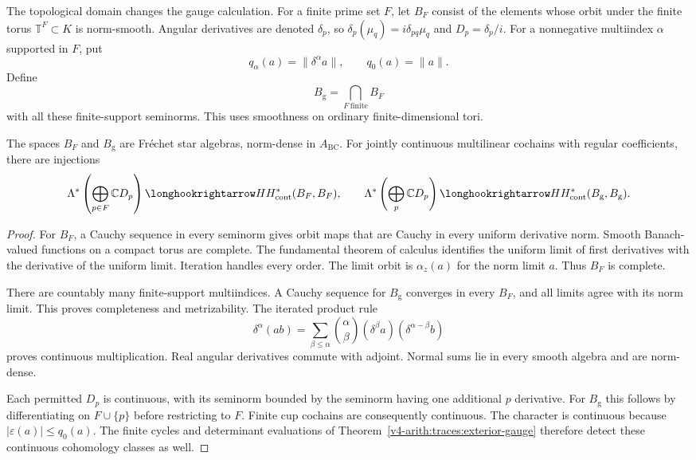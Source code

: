 The topological domain changes the gauge calculation. For a finite prime set
$F$, let $B_F$ consist of the elements whose orbit under the finite torus
$\mathbb T^F\subset K$ is norm-smooth. Angular derivatives are denoted
$\delta_p$, so $\delta_p(\mu_q)=i\delta_{pq}\mu_q$ and $D_p=\delta_p/i$. For
a nonnegative multiindex $\alpha$ supported in $F$, put
\[
 q_\alpha(a)=\|\delta^\alpha a\|,\qquad
 q_0(a)=\|a\|.
\]
Define
\[
 B_{\mathrm g}=\bigcap_{F\ \mathrm{finite}}B_F
\]
with all these finite-support seminorms. This uses smoothness on ordinary
finite-dimensional tori.

\begin{proposition}
\label{v4-arith:traces:gauge-smooth}
The spaces $B_F$ and $B_{\mathrm g}$ are Fr\'echet star algebras, norm-dense
in $A_{\mathrm{BC}}$. For jointly continuous multilinear cochains with
regular coefficients, there are injections
\[
 \Lambda^*\left(\bigoplus_{p\in F}\mathbb C D_p\right)
       \longhookrightarrow HH^*_{\mathrm{cont}}(B_F,B_F),
 \qquad
 \Lambda^*\left(\bigoplus_p\mathbb C D_p\right)
       \longhookrightarrow HH^*_{\mathrm{cont}}(B_{\mathrm g},B_{\mathrm g}).
\]
\end{proposition}
\begin{proof}
For $B_F$, a Cauchy sequence in every seminorm gives orbit maps that are
Cauchy in every uniform derivative norm. Smooth Banach-valued functions on a
compact torus are complete. The fundamental theorem of calculus identifies
the uniform limit of first derivatives with the derivative of the uniform
limit. Iteration handles every order. The limit orbit is $\alpha_z(a)$ for
the norm limit $a$. Thus $B_F$ is complete.

There are countably many finite-support multiindices. A Cauchy sequence for
$B_{\mathrm g}$ converges in every $B_F$, and all limits agree with its norm
limit. This proves completeness and metrizability. The iterated product rule
\[
 \delta^\alpha(ab)=
   \sum_{\beta\leq\alpha}\binom{\alpha}{\beta}
       (\delta^\beta a)(\delta^{\alpha-\beta}b)
\]
proves continuous multiplication. Real angular derivatives commute with
adjoint. Normal sums lie in every smooth algebra and are norm-dense.

Each permitted $D_p$ is continuous, with its seminorm bounded by the
seminorm having one additional $p$ derivative. For $B_{\mathrm g}$ this
follows by differentiating on $F\cup\{p\}$ before restricting to $F$. Finite
cup cochains are consequently continuous. The character is continuous
because $|\varepsilon(a)|\leq q_0(a)$. The finite cycles and determinant
evaluations of Theorem~\ref{v4-arith:traces:exterior-gauge} therefore detect
these continuous cohomology classes as well.
\end{proof}

